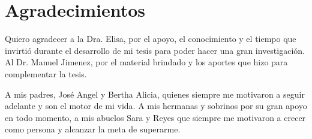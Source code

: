 
\chapter{Agradecimientos}

Quiero agradecer a la Dra. Elisa, por el apoyo, el conocimiento y el tiempo que invirtió durante el desarrollo de mi tesis para poder hacer una gran investigación. Al Dr. Manuel Jimenez, por el material brindado y los aportes que hizo para complementar la tesis. 

A mis padres, José Angel y Bertha Alicia, quienes siempre me motivaron a seguir adelante y son el motor de mi vida. A mis hermanas y sobrinos por su gran apoyo en todo momento, a mis abuelos Sara y Reyes que siempre me motivaron a crecer como persona y alcanzar la meta de superarme.

